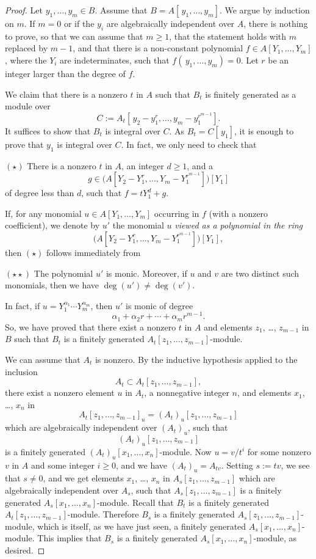 \documentclass[parskip=half,fontsize=12pt]{scrartcl}%
\begin{document}
\begin{proof} 
Let $y_1,\dots,y_m\in B$. Assume that $B=A[\,y_1,\dots,y_m]$. We argue by induction on $m$. If $m=0$ or if the $y_i$ are algebraically independent over $A$, there is nothing to prove, so that we can assume that $m\ge1$, that the statement holds with $m$ replaced by $m-1$, and that there is a non-constant polynomial $f\in A[Y_1,\dots,Y_m]$, where the $Y_i$ are indeterminates, such that $f(\,y_1,\dots,y_m)=0$. Let $r$ be an integer larger than the degree of $f$. 

We claim that there is a nonzero $t$ in $A$ such that $B_t$ is finitely generated as a module over 
$$
C:=A_t\left[\,y_2-y_1^r,\dots,y_m-y_1^{r^{m-1}}\right].
$$ 
It suffices to show that $B_t$ is integral over $C$. As $B_t=C[\,y_1]$, it is enough to prove that $y_1$ is integral over $C$. In fact, we only need to check that 

$(\star)$ There is a nonzero $t$ in $A$, an integer $d\ge1$, and a 
$$
g\in\bigg(A\left[Y_2-Y_1^r,\dots,Y_m-Y_1^{r^{m-1}}\right]\bigg)[Y_1]
$$ 
of degree less than $d$, such that $f=tY_1^d+g$. 

If, for any monomial $u\in A[Y_1,\dots,Y_m]$ occurring in $f$ (with a nonzero coefficient), we denote by $u'$ the monomial $u$ \emph{viewed as a polynomial in the ring} 
$$
\bigg(A\left[Y_2-Y_1^r,\dots,Y_m-Y_1^{r^{m-1}}\right]\bigg)[Y_1],
$$ 
then $(\star)$ follows immediately from 

$(\star\star)$ The polynomial $u'$ is monic. Moreover, if $u$ and $v$ are two distinct such monomials, then we have $\deg(u')\ne\deg(v')$.

In fact, if $u=Y_1^{\alpha_1}\cdots Y_m^{\alpha_m}$, then $u'$ is monic of degree 
$$
\alpha_1+\alpha_2r+\cdots+\alpha_mr^{m-1}.
$$ 
So, we have proved that there exist a nonzero $t$ in $A$ and elements $z_1$, \dots, $z_{m-1}$ in $B$ such that $B_t$ is a finitely generated $A_t[z_1,\dots,z_{m-1}]$-module. 

We can assume that $A_t$ is nonzero. By the inductive hypothesis applied to the inclusion 
$$
A_t\subset A_t[z_1,\dots,z_{m-1}],
$$ 
there exist a nonzero element $u$ in $A_t$, a nonnegative integer $n$, and elements $x_1$, \dots, $x_n$ in 
$$
A_t[z_1,\dots,z_{m-1}]_u=(A_t)_u[z_1,\dots,z_{m-1}]
$$ 
which are algebraically independent over $(A_t)_u$, such that 
$$
(A_t)_u[z_1,\dots,z_{m-1}]
$$ 
is a finitely generated $(A_t)_u[x_1,\dots,x_n]$-module. Now $u=v/t^i$ for some nonzero $v$ in $A$ and some integer $i\ge0$, and we have $(A_t)_u=A_{tv}$. Setting $s:=tv$, we see that $s\ne0$, and we get elements $x_1$, \dots, $x_n$ in 
$
A_s[z_1,\dots,z_{m-1}]
$ 
which are algebraically independent over $A_s$, such that 
$
A_s[z_1,\dots,z_{m-1}]
$ 
is a finitely generated $A_s[x_1,\dots,x_n]$-module. Recall that $B_t$ is a finitely generated $A_t[z_1,\dots,z_{m-1}]$-module. Therefore $B_s$ is a finitely generated $A_s[z_1,\dots,z_{m-1}]$-module, which is itself, as we have just seen, a finitely generated $A_s[x_1,\dots,x_n]$-module. This implies that $B_s$ is a finitely generated $A_s[x_1,\dots,x_n]$-module,  as desired.
\end{proof} 
\end{document}
